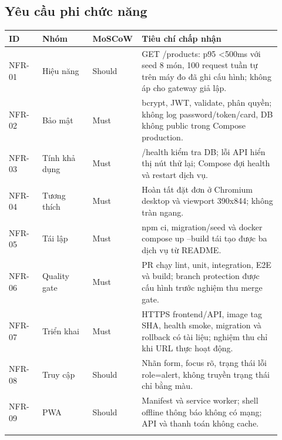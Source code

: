 \documentclass[a4paper,12pt,oneside]{report}
\begin{document}
\subsection{Yêu cầu phi chức năng}
\begingroup\fontsize{9}{11}\selectfont\setlength{\tabcolsep}{3pt}\renewcommand{\arraystretch}{1.35}
\begin{longtable}{@{}>{\raggedright\arraybackslash}p{0.12\linewidth} >{\raggedright\arraybackslash}p{0.18\linewidth} >{\raggedright\arraybackslash}p{0.12\linewidth} >{\raggedright\arraybackslash}p{0.5\linewidth}@{}}
\toprule
\textbf{ID} & \textbf{Nhóm} & \textbf{MoSCoW} & \textbf{Tiêu chí chấp nhận} \\
\midrule\endhead
NFR-01 & Hiệu năng & Should & GET /\allowbreak{}products: p95 <500ms với seed 8 món, 100 request tuần tự trên máy đo đã ghi cấu hình; không áp cho gateway giả lập. \\
\addlinespace[2pt]
NFR-02 & Bảo mật & Must & bcrypt, JWT, validate, phân quyền; không log password/\allowbreak{}token/\allowbreak{}card, DB không public trong Compose production. \\
\addlinespace[2pt]
NFR-03 & Tính khả dụng & Must & /\allowbreak{}health kiểm tra DB; lỗi API hiển thị nút thử lại; Compose đợi health và restart dịch vụ. \\
\addlinespace[2pt]
NFR-04 & Tương thích & Must & Hoàn tất đặt đơn ở Chromium desktop và viewport 390x844; không tràn ngang. \\
\addlinespace[2pt]
NFR-05 & Tái lập & Must & npm ci, migration/\allowbreak{}seed và docker compose up --build tái tạo được ba dịch vụ từ README. \\
\addlinespace[2pt]
NFR-06 & Quality gate & Must & PR chạy lint, unit, integration, E2E và build; branch protection được cấu hình trước nghiệm thu merge gate. \\
\addlinespace[2pt]
NFR-07 & Triển khai & Must & HTTPS frontend/\allowbreak{}API, image tag SHA, health smoke, migration và rollback có tài liệu; nghiệm thu chỉ khi URL thực hoạt động. \\
\addlinespace[2pt]
NFR-08 & Truy cập & Should & Nhãn form, focus rõ, trạng thái lỗi role=alert, không truyền trạng thái chỉ bằng màu. \\
\addlinespace[2pt]
NFR-09 & PWA & Should & Manifest và service worker; shell offline thông báo không có mạng; API và thanh toán không cache. \\
\addlinespace[2pt]
\bottomrule\end{longtable}\endgroup
\end{document}
